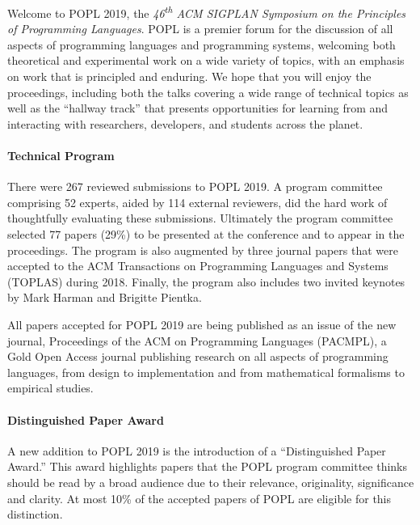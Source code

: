 \label{Preface}


\newcommand\person[1]{{#1}}

\noindent

Welcome to POPL 2019, the
\emph{46\textsuperscript{th} ACM SIGPLAN Symposium
on the Principles of Programming Languages}.
%
POPL is a premier forum for the discussion of all aspects
of programming languages and programming systems, welcoming
both theoretical and experimental work on a wide variety of
topics, with an emphasis on work that is principled and enduring.
%
We hope that you will enjoy the proceedings,
including both the talks covering a wide range
of technical topics as well as the ``hallway track''
that presents opportunities for learning from
and interacting with researchers, developers,
and students across the planet.


\paragraph{Technical Program}
%
There were 267 reviewed submissions to POPL 2019.
%
A program committee comprising 52 experts,
aided by 114 external reviewers, did the hard work of
thoughtfully evaluating these submissions.
%
Ultimately the program committee selected 77 papers (29\%)
to be presented at the conference and to appear in the
proceedings. 
%
The program is also augmented by three journal papers that were accepted to
the ACM Transactions on Programming Languages and Systems (TOPLAS) during
2018.
%
Finally, the program also includes two invited keynotes by Mark Harman
and Brigitte Pientka.

All papers accepted for POPL 2019 are being published as an issue of the new
journal, Proceedings of the ACM on Programming Languages (PACMPL), a Gold Open
Access journal publishing research on all aspects of programming languages,
from design to implementation and from mathematical formalisms to empirical
studies.

\paragraph{Distinguished Paper Award}

A new addition to POPL 2019 is the introduction of a ``Distinguished Paper
Award.'' This award highlights papers that the POPL program committee thinks
should be read by a broad audience due to their relevance, originality,
significance and clarity. At most 10\% of the accepted papers of POPL are
eligible for this distinction.

